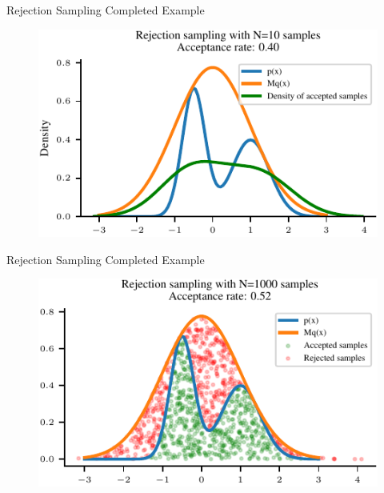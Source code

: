 \documentclass[handout]{beamer}
\begin{document}
    \begin{frame}{Rejection Sampling Completed Example}
        \begin{figure}
            \centering
            \includegraphics{notebooks/figures/sampling/rejection-sampling-N10-True.pdf}
        \end{figure}
        
    \end{frame}

    \begin{frame}{Rejection Sampling Completed Example}
        \begin{figure}
            \centering
            \includegraphics{notebooks/figures/sampling/rejection-sampling-N1000-False.pdf}
        \end{figure}
    \end{frame}
\end{document}
